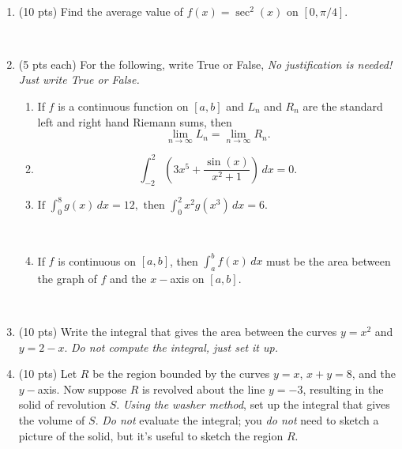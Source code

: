 \documentclass[12pt, oneside]{article}   	%
\title{}
\author{MATH1103   \ \ \ \ \ \ Midterm 1 \ \ \ \  September 27, 2021\ \ \ \ Version A\\  \\ Closed book, closed notes; show all your work.}
\date{}							%
\begin{document}
\maketitle


\

\begin{enumerate} 

\item 
(10 pts) Find the average value of $f(x)=\sec^2(x)$ on $[0,\pi/4]$.

\

\item (5 pts each) For the following, write True or False, \emph{No justification is needed! Just write True or False.}

\begin{enumerate}

\item  If $f$ is a continuous function on $[a,b]$ and $L_n$ and $R_n$ are the standard left and right hand Riemann sums, then
$$\lim_{n \to \infty} L_n= \lim_{n \to \infty} R_n.$$

\item $$\int_{-2}^2 \left(3x^5+ \dfrac{\sin(x)}{x^2+1} \right) \, dx=0.$$

\item $ \textrm{If } \int_0^8 g(x) \, dx= 12, \textrm{ then } \int_0^2 x^2 g(x^3) \, dx= 6.$

\

\item If $f$ is continuous on $[a,b]$, then $\int_a^b f(x) \, dx$ must be the area between the graph of $f$ and the $x-$axis on $[a,b]$.

\end{enumerate}

\

\item (10 pts) Write the integral that gives the area between the curves $y=x^2$ and $y=2-x$. \emph{ Do not compute the integral, just set it up.}


\newpage

\item (10 pts) Let $R$ be the region bounded by the curves $y=x$, $x+y=8$, and the $y-$axis. Now suppose $R$ is revolved about the line $y=-3$, resulting in the solid of revolution $S$. \emph{Using the washer method}, set up the integral that gives the volume of $S$. \emph{Do not } evaluate the integral; you \emph{do not} need to sketch a picture of the solid, but it's useful to sketch the region $R$.




\end{enumerate}
\end{document}

